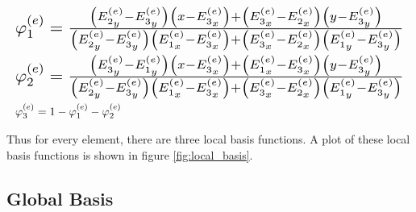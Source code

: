 \documentclass[../fem.tex]{subfiles}
\begin{document}
\begin{align}\label{eq:local_basis}
  &\resizebox{\columnwidth}{!}{$
    \varphi_1^{(e)}=
  \frac{\left(E^{(e)}_{2_y}-E^{(e)}_{3_y}\right)\left(x-E^{(e)}_{3_x}\right)+\left(E^{(e)}_{3_x}-E^{(e)}_{2_x}\right)\left(y-E^{(e)}_{3_y}\right)}{\left(E^{(e)}_{2_y}-E^{(e)}_{3_y}\right)\left(E^{(e)}_{1_x}-E^{(e)}_{3_x}\right)+\left(E^{(e)}_{3_x}-E^{(e)}_{2_x}\right)\left(E^{(e)}_{1_y}-E^{(e)}_{3_y}\right)}
  $}\\
  &\resizebox{\columnwidth}{!}{$
    \varphi_2^{(e)}=
    \frac{\left(E^{(e)}_{3_y}-E^{(e)}_{1_y}\right)\left(x-E^{(e)}_{3_x}\right)+\left(E^{(e)}_{1_x}-E^{(e)}_{3_x}\right)\left(y-E^{(e)}_{3_y}\right)}{\left(E^{(e)}_{2_y}-E^{(e)}_{3_y}\right)\left(E^{(e)}_{1_x}-E^{(e)}_{3_x}\right)+\left(E^{(e)}_{3_x}-E^{(e)}_{2_x}\right)\left(E^{(e)}_{1_y}-E^{(e)}_{3_y}\right)}
  $}\\
  &\varphi_3^{(e)}=1-\varphi_1^{(e)}-\varphi_2^{(e)}
\end{align}

Thus for every element, there are three local basis functions. A plot of these
local basis functions is shown in figure \ref{fig:local_basis}.

\begin{Figure}
   \begin{center}
   \end{center}
   \label{fig:local_basis}
\end{Figure}

\subsection{Global Basis}%
\label{sub:global_basis}
\end{document}
